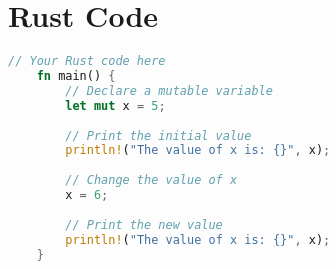 \section{Rust Code}

\begin{lstlisting}[language=Rust,
	style=mystyle,
	caption={An example of Rust code.},
	label={example-rust}]
	// Your Rust code here
	fn main() {
		// Declare a mutable variable
		let mut x = 5; 
		
		// Print the initial value
		println!("The value of x is: {}", x); 
		
		// Change the value of x
		x = 6; 
		
		// Print the new value
		println!("The value of x is: {}", x); 
	}
\end{lstlisting}